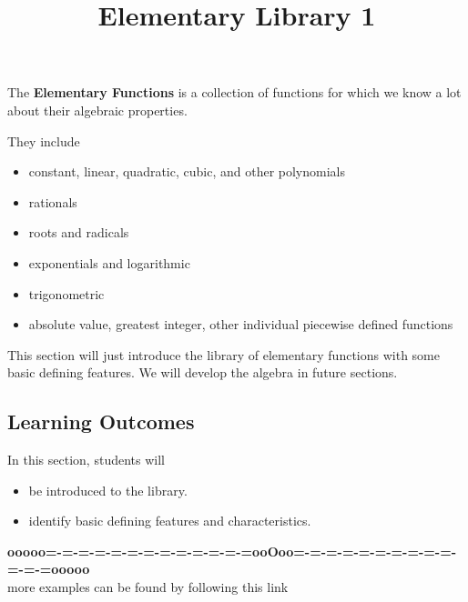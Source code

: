 \documentclass{ximera}
\title{Elementary Library 1}
\begin{document}
\begin{abstract}
\end{abstract}
\maketitle




The \textbf{Elementary Functions} is a collection of functions for which we know a lot about their algebraic properties.

They include 

\begin{itemize}
\item constant, linear, quadratic, cubic, and other polynomials
\item rationals
\item roots and radicals
\item exponentials and logarithmic
\item trigonometric
\item absolute value, greatest integer, other individual piecewise defined functions
\end{itemize}



This section will just introduce the library of elementary functions with some basic defining features.  We will develop the algebra in future sections.












\subsection{Learning Outcomes}

\begin{sectionOutcomes}
In this section, students will 

\begin{itemize}
\item be introduced to the library.
\item identify basic defining features and characteristics.
\end{itemize}
\end{sectionOutcomes}







\begin{center}
\textbf{\textcolor{green!50!black}{ooooo=-=-=-=-=-=-=-=-=-=-=-=-=ooOoo=-=-=-=-=-=-=-=-=-=-=-=-=ooooo}} \\

more examples can be found by following this link\\ 

\end{center}
\end{document}
